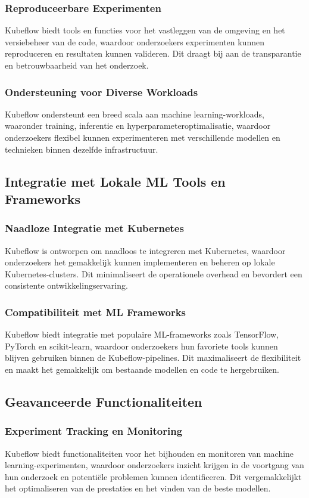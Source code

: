 \subsubsection{Reproduceerbare Experimenten}
Kubeflow biedt tools en functies voor het vastleggen van de omgeving en het versiebeheer van de code, waardoor onderzoekers experimenten kunnen reproduceren en resultaten kunnen valideren. Dit draagt bij aan de transparantie en betrouwbaarheid van het onderzoek.

\subsubsection{Ondersteuning voor Diverse Workloads}
Kubeflow ondersteunt een breed scala aan machine learning-workloads, waaronder training, inferentie en hyperparameteroptimalisatie, waardoor onderzoekers flexibel kunnen experimenteren met verschillende modellen en technieken binnen dezelfde infrastructuur.

\subsection{Integratie met Lokale ML Tools en Frameworks}

\subsubsection{Naadloze Integratie met Kubernetes}
Kubeflow is ontworpen om naadloos te integreren met Kubernetes, waardoor onderzoekers het gemakkelijk kunnen implementeren en beheren op lokale Kubernetes-clusters. Dit minimaliseert de operationele overhead en bevordert een consistente ontwikkelingservaring.

\subsubsection{Compatibiliteit met ML Frameworks}
Kubeflow biedt integratie met populaire ML-frameworks zoals TensorFlow, PyTorch en scikit-learn, waardoor onderzoekers hun favoriete tools kunnen blijven gebruiken binnen de Kubeflow-pipelines. Dit maximaliseert de flexibiliteit en maakt het gemakkelijk om bestaande modellen en code te hergebruiken.

\subsection{Geavanceerde Functionaliteiten}

\subsubsection{Experiment Tracking en Monitoring}
Kubeflow biedt functionaliteiten voor het bijhouden en monitoren van machine learning-experimenten, waardoor onderzoekers inzicht krijgen in de voortgang van hun onderzoek en potentiële problemen kunnen identificeren. Dit vergemakkelijkt het optimaliseren van de prestaties en het vinden van de beste modellen.

